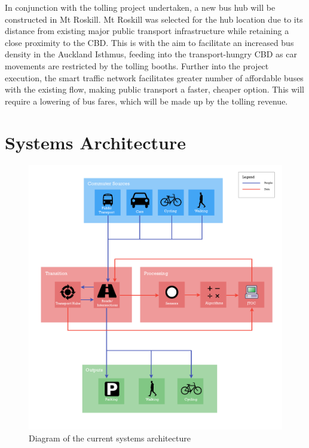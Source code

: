 \documentclass[twoside, a4paper, 11pt]{article}
\begin{document}
In conjunction with the tolling project undertaken, a new bus hub will be constructed in Mt Roskill. Mt Roskill was selected for the hub location due to its distance from existing major public transport infrastructure while retaining a close proximity to the CBD. This is with the aim to facilitate an increased bus density in the Auckland Isthmus, feeding into the transport-hungry CBD as car movements are restricted by the tolling booths. Further into the project execution, the smart traffic network facilitates greater number of affordable buses with the existing flow, making public transport a faster, cheaper option. This will require a lowering of bus fares, which will be made up by the tolling revenue.
\newpage


\section{Systems Architecture}
\begin{figure}[H]
\centering
\includegraphics[width=\textwidth]{SystemsArchitectureCurrent.png}
\caption{Diagram of the current systems architecture}
\label{fig:sac}
\end{figure}
\newpage
\end{document}
